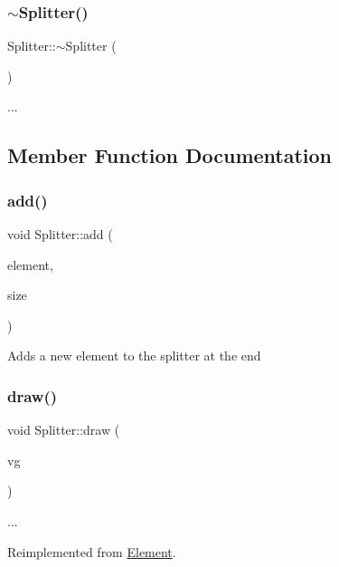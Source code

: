 \subsubsection{\texorpdfstring{$\sim$\+Splitter()}{~Splitter()}}
{\footnotesize\ttfamily Splitter\+::$\sim$\+Splitter (\begin{DoxyParamCaption}{ }\end{DoxyParamCaption})}

... 

\subsection{Member Function Documentation}
\mbox{\label{class_splitter_a4cfa6bad909de07691b290f56de1a175}} 
\subsubsection{\texorpdfstring{add()}{add()}}
{\footnotesize\ttfamily void Splitter\+::add (\begin{DoxyParamCaption}\item[{\hyperlink{class_element}{Element} $\ast$}]{element,  }\item[{float}]{size }\end{DoxyParamCaption})}

Adds a new element to the splitter at the end \mbox{\label{class_splitter_acdda30b580520e68531dfa90511a8514}} 
\subsubsection{\texorpdfstring{draw()}{draw()}}
{\footnotesize\ttfamily void Splitter\+::draw (\begin{DoxyParamCaption}\item[{N\+V\+Gcontext $\ast$}]{vg }\end{DoxyParamCaption})\hspace{0.3cm}{\ttfamily [virtual]}}

... 

Reimplemented from \hyperlink{class_element_a37c9abed5bec87d9ce0a5e74fb872f34}{Element}.

\mbox{\label{class_splitter_a38aab36f28b7f5b834fefae247f5c37e}} 
